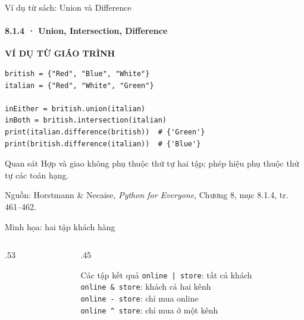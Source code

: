 \documentclass[aspectratio=169,10pt]{beamer}
\newcommand{\py}[1]{{\color{deepnavy}\texttt{#1}}}
\begin{document}
\begin{frame}[fragile,t]{Ví dụ từ sách: Union và Difference}
\framesubtitle{8.1.4 · Union, Intersection, Difference}
{\small\color{teal}\textbf{VÍ DỤ TỪ GIÁO TRÌNH}}\par\medskip
\begin{Verbatim}[fontsize=\footnotesize,frame=single,framesep=3mm,rulecolor=\color{teal!35},breaklines=true]
british = {"Red", "Blue", "White"}
italian = {"Red", "White", "Green"}

inEither = british.union(italian)
inBoth = british.intersection(italian)
print(italian.difference(british))  # {'Green'}
print(british.difference(italian))  # {'Blue'}
\end{Verbatim}
\begin{block}{Quan sát}
Hợp và giao không phụ thuộc thứ tự hai tập; phép hiệu phụ thuộc thứ tự các toán hạng.
\end{block}
\vfill
{\scriptsize\color{muted}Nguồn: Horstmann \& Necaise, \textit{Python for Everyone}, Chương 8, mục 8.1.4, tr. 461–462.}
\end{frame}


\begin{frame}[t]{Minh họa: hai tập khách hàng}

\begin{columns}[T,onlytextwidth]
\begin{column}{.53\linewidth}
\centering
{}
\end{column}
\begin{column}{.45\linewidth}
\small
\begin{block}{Các tập kết quả}
\py{online | store}: tất cả khách\\[5pt]
\py{online \& store}: khách cả hai kênh\\[5pt]
\py{online - store}: chỉ mua online\\[5pt]
\py{online \^{} store}: chỉ mua ở một kênh
\end{block}
\end{column}
\end{columns}

\end{frame}
\end{document}
